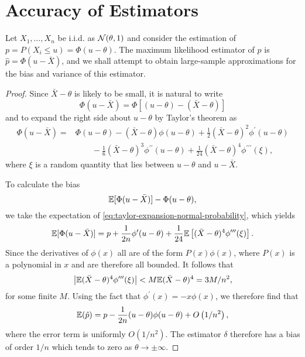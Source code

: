 \section{Accuracy of Estimators}

\begin{example}
	Let $X_{1},\ldots,X_{n}$ be i.i.d. as ${\mathcal N}(\theta,1)$ and consider the estimation of $p=P\left(X_{i}\leq u\right)=\Phi(u-\theta)$. The maximum likelihood estimator of $p$ is $\hat{p}=\Phi(u-\bar{X})$, and we shall attempt to obtain large-sample approximations for the bias and variance of this estimator.
\end{example}

\begin{proof}
	Since $\bar{X}-\theta$ is likely to be small, it is natural to write
	\begin{equation*}
		\Phi(u-\bar{X})=\Phi[(u-\theta)-(\bar{X}-\theta)]
	\end{equation*}
	and to expand the right side about $u-\theta$ by Taylor's theorem as
	\begin{equation}
		\label{eq:taylor-expansion-normal-probability}
		\begin{aligned}
			\Phi(u-\bar{X})= & \Phi(u-\theta)-(\bar{X}-\theta)\phi(u-\theta)+\frac{1}{2}(\bar{X}-\theta)^{2}\phi^{\prime}(u-\theta)                                  \\
			                 & \qquad -\frac{1}{6}(\bar{X}-\theta)^{3}\phi^{\prime\prime}(u-\theta)+\frac{1}{24}(\bar{X}-\theta)^{4}\phi^{\prime\prime \prime}(\xi),
		\end{aligned}
	\end{equation}
	where $\xi$ is a random quantity that lies between $u-\theta$ and $u-\bar{X}$.

	To calculate the bias
	\begin{equation*}
		{\mathbb E}[\Phi(u-\bar{X})]-\Phi(u-\theta),
	\end{equation*}
	we take the expectation of \eqref{eq:taylor-expansion-normal-probability}, which yields
	\begin{equation*}
		{\mathbb E}[\Phi(u-\bar{X})]=p+\frac{1}{2n}\phi^{\prime}(u-\theta)+\frac{1}{24}{\mathbb E}\left[(\bar{X}-\theta)^4\phi^{\prime\prime\prime}(\xi)\right].
	\end{equation*}
	Since the derivatives of $\phi(x)$ all are of the form $P(x)\phi(x)$, where $P(x)$ is a polynomial in $x$ and are therefore all bounded. It follows that
	\begin{equation*}
		\left|{\mathbb E}(\bar{X}-\theta)^{4}\phi^{\prime\prime\prime}(\xi)\right|<M{\mathbb E}(\bar{X}-\theta)^{4}=3M/n^2,
	\end{equation*}
	for some finite $M$. Using the fact that $\phi^{\prime}(x)=-x \phi(x)$, we therefore find that
	\begin{equation*}
		{\mathbb E}(\hat{p})=p-\frac{1}{2n}(u-\theta)\phi(u-\theta)+O\left(1/n^{2}\right),
	\end{equation*}
	where the error term is uniformly $O\left(1 / n^2\right)$.
	The estimator $\delta$ therefore has a bias of order $1/n$ which tends to zero as $\theta \rightarrow \pm \infty$.


\end{proof}
